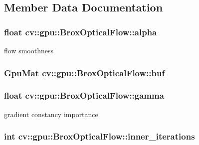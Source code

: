 \subsection{Member Data Documentation}
\hypertarget{classcv_1_1gpu_1_1BroxOpticalFlow_a3cde47ad49aa16be21b776479d76e2a9}{
\subsubsection[{alpha}]{\setlength{\rightskip}{0pt plus 5cm}float cv\-::gpu\-::\-Brox\-Optical\-Flow\-::alpha}}\label{classcv_1_1gpu_1_1BroxOpticalFlow_a3cde47ad49aa16be21b776479d76e2a9}


flow smoothness 

\hypertarget{classcv_1_1gpu_1_1BroxOpticalFlow_a8966537234dabe1808b1b66d1dc8ab04}{
\subsubsection[{buf}]{\setlength{\rightskip}{0pt plus 5cm}Gpu\-Mat cv\-::gpu\-::\-Brox\-Optical\-Flow\-::buf}}\label{classcv_1_1gpu_1_1BroxOpticalFlow_a8966537234dabe1808b1b66d1dc8ab04}
\hypertarget{classcv_1_1gpu_1_1BroxOpticalFlow_a38340441419110e891bbe148be6ca6ab}{
\subsubsection[{gamma}]{\setlength{\rightskip}{0pt plus 5cm}float cv\-::gpu\-::\-Brox\-Optical\-Flow\-::gamma}}\label{classcv_1_1gpu_1_1BroxOpticalFlow_a38340441419110e891bbe148be6ca6ab}


gradient constancy importance 

\hypertarget{classcv_1_1gpu_1_1BroxOpticalFlow_ae6cd22cc2991f12a092a5887d769b5d7}{
\subsubsection[{inner\-\_\-iterations}]{\setlength{\rightskip}{0pt plus 5cm}int cv\-::gpu\-::\-Brox\-Optical\-Flow\-::inner\-\_\-iterations}}\label{classcv_1_1gpu_1_1BroxOpticalFlow_ae6cd22cc2991f12a092a5887d769b5d7}


